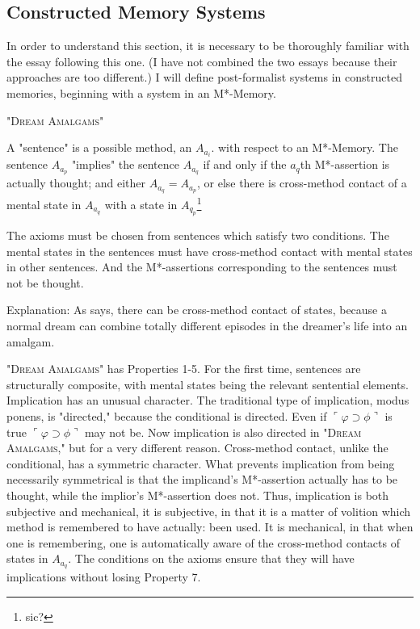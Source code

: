 \subsection{Constructed Memory Systems}

In order to understand this section, it is necessary to be thoroughly 
familiar with  the essay following this 
one. (I have not combined the two essays because their approaches are too 
different.) I will define post-formalist systems in constructed memories, 
beginning with a system in an M*-Memory. 

{ \centering \large "\textsc{Dream Amalgams}" \par}

\begin{sysrules}
A "sentence" is a possible method, an $A_{a_i}$. with respect to an M*-Memory. 
The sentence $A_{a_p}$ "implies" the sentence $A_{a_q}$ if and only if the $a_q$th 
M*-assertion is actually thought; and either $A_{a_q} = A_{a_p}$, or else there is 
cross-method contact of a mental state in $A_{a_q}$ with a state in $A_{q_p}$\footnote{sic?}

The axioms must be chosen from sentences which satisfy two conditions. 
The mental states in the sentences must have cross-method contact 
with mental states in other sentences. And the M*-assertions 
corresponding to the sentences must not be thought. 

Explanation: As  says, there can be 
cross-method contact of states, because a normal dream can 
combine totally different episodes in the dreamer's life into an 
amalgam. 
\end{sysrules}

"\textsc{Dream Amalgams}" has Properties 1-5. For the first time, sentences are 
structurally composite, with mental states being the relevant sentential 
elements. Implication has an unusual character. The traditional type of 
implication, modus ponens, is "directed," because the conditional is 
directed. Even if $\ulcorner\varphi\supset\phi\urcorner$ is true 
$\ulcorner\varphi\supset\phi\urcorner$ may not be. Now implication is also 
directed in "\textsc{Dream Amalgams,}" but for a very different reason. 
Cross-method contact, unlike the conditional, has a symmetric character. 
What prevents implication from being necessarily symmetrical is that the 
implicand's M*-assertion actually has to be thought, while the implior's 
M*-assertion does not. Thus, implication is both subjective and mechanical, 
it is subjective, in that it is a matter of volition which method is remembered 
to have actually: been used. It is mechanical, in that when one is 
remembering, one is automatically aware of the cross-method contacts of 
states in $A_{a_q}$. The conditions on the axioms ensure that they will have 
implications without losing Property 7. 


